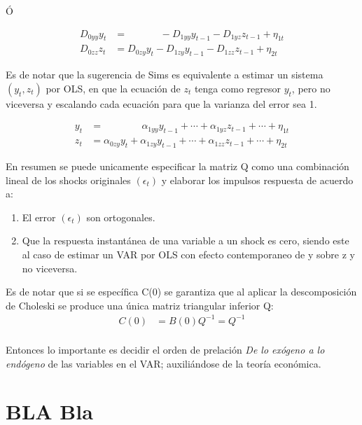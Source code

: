 \documentclass[
]{book}
\providecommand{\tightlist}{%
  \setlength{\itemsep}{0pt}\setlength{\parskip}{0pt}}
\begin{document}
Ó

\begin{align}
D_{0yy}y_{t}&=\;\;\;\;\;\;\;\;\;\;\;\;-D_{1yy}y_{t-1}-D_{1yz}z_{t-1}+\eta_{1t}\nonumber \\
D_{0zz}z_{t}&=D_{0zy}y_{t}-D_{1zy}y_{t-1}-D_{1zz}z_{t-1}+\eta_{2t}\nonumber
\end{align}

Es de notar que la sugerencia de Sims es equivalente a estimar un sistema \((y_{t}, z_{t})\) por OLS, en que la ecuación de \(z_{t}\) tenga como regresor \(y_{t}\), pero no viceversa y escalando cada ecuación para que la varianza del error sea 1.

\begin{align}
y_{t}&=\;\;\;\;\;\;\;\;\;\;\;\;\;\;\alpha_{1yy}y_{t-1}+\cdots+\alpha_{1yz}z_{t-1}+\cdots+\eta_{1t}\nonumber \\
z_{t}&=\alpha_{0zy}y_{t}+\alpha_{1zy}y_{t-1}+\cdots+\alpha_{1zz}z_{t-1}+\cdots +\eta_{2t}\nonumber
\end{align}

En resumen se puede unicamente especificar la matriz Q como una combinación lineal de los shocks originales \((\epsilon_{t})\) y elaborar los impulsos respuesta de acuerdo a:

\begin{enumerate}
\def\labelenumi{\arabic{enumi}.}
\tightlist
\item
  El error \((\epsilon_{t})\) son ortogonales.
\item
  Que la respuesta instantánea de una variable a un shock es cero, siendo este al caso de estimar un VAR por OLS con efecto contemporaneo de y sobre z y no viceversa.
\end{enumerate}

Es de notar que si se específica C(0) se garantiza que al aplicar la descomposición de Choleski se produce una única matriz triangular inferior Q:
\begin{align}
C(0)&=B(0)Q^{-1}=Q^{-1} \nonumber\\
\end{align}

Entonces lo importante es decidir el orden de prelación \emph{De lo exógeno a lo endógeno} de las variables en el VAR; auxiliándose de la teoría económica.

\hypertarget{bla-bla}{%
\section{BLA Bla}\label{bla-bla}}
\end{document}
